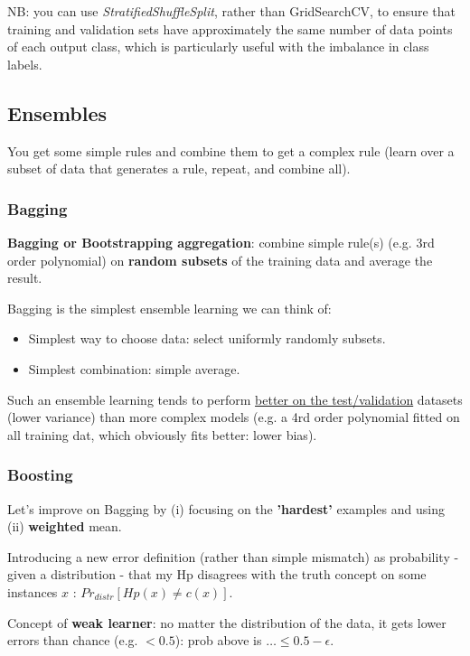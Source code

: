 \documentclass[11pt]{article}
\begin{document}
NB: you can use \textit{StratifiedShuffleSplit}, rather than GridSearchCV, to ensure that training and validation sets have approximately the same number of data points of each output class, which is particularly useful with the imbalance in class labels.

\subsection{Ensembles}
You get some simple rules and combine them to get a complex rule (learn over a subset of data that generates a rule, repeat, and combine all).

%
\subsubsection{Bagging}
\textbf{Bagging or Bootstrapping aggregation}: combine simple rule(s) (e.g. 3rd order polynomial) on \textbf{random subsets} of the training data and average the result. 

Bagging is the simplest ensemble learning we can think of: 
\begin{itemize}
	\item Simplest way to choose data: select uniformly randomly subsets.
	\item Simplest combination: simple average.
\end{itemize}

Such an ensemble learning tends to perform \underline{better on the test/validation} datasets (lower variance) than more complex models (e.g. a 4rd order polynomial fitted on all training dat, which obviously fits better: lower bias).

%
\subsubsection{Boosting}
Let's improve on Bagging by (i) focusing on the \textbf{'hardest'} examples and using (ii) \textbf{weighted} mean.

Introducing a new error definition (rather than simple mismatch) as probability - given a distribution - that my Hp disagrees with the truth concept on some instances $x$ : $Pr_{distr}[Hp(x) \neq c(x)]$. 

Concept of \textbf{weak learner}: no matter the distribution of the data, it gets lower errors than chance (e.g. $<0.5$): prob above is $ \ldots \leq 0.5 - \epsilon$.
\end{document}

